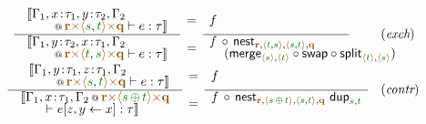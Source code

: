 \begin{figure*}[!t]
\begin{equation*}
\begin{array}{ll}
\hspace{0.5em}\mdeff
  {\begin{array}{l}\sem{\coctx{\Gamma_1,x\!:\!\tau_1,y\!:\!\tau_2,\Gamma_2\\[-0.25em]\qquad}
     {\aclrd{\textbf{r}} \atimes \alift{\cclrd{s},\cclrd{t}} \atimes \aclrd{\textbf{q}}} \vdash e : \tau}\end{array}}
  {\begin{array}{l}\sem{\coctx{\Gamma_1,y\!:\!\tau_2,x\!:\!\tau_1,\Gamma_2\\[-0.25em]\qquad}{\aclrd{\textbf{r}}
          \atimes \alift{\cclrd{t},\cclrd{s}} \atimes \aclrd{\textbf{q}}} \vdash e : \tau}\end{array}}
  {f}
  {\begin{array}{l}\hspace{-0.5em}f\,\circ\,\ident{nest}_{\aclrd{\textbf{r}}, \alift{\cclrd{t},\cclrd{s}},
     \alift{\cclrd{s},\cclrd{t}}, \aclrd{\textbf{q}}}\\[-0.25em]
     ~~(\ident{merge}_{\alift{\cclrd{s}}, \alift{\cclrd{t}}}\circ\ident{swap}\circ\ident{split}_{\alift{\cclrd{t}}, \alift{\cclrd{s}}})\hspace{-5em}~ \end{array} }
& (\emph{exch})
\\[1.5em]
\hspace{0em}\mdeff
  {\begin{array}{l}\sem{\coctx{\Gamma_1,y\!:\!\tau_1,z\!:\!\tau_1,\Gamma_2\\[-0.25em]\qquad}
      {\aclrd{\textbf{r}} \atimes \alift{\cclrd{s},\cclrd{t}} \atimes \aclrd{\textbf{q}}} \vdash e : \tau}\end{array}}
  {\begin{array}{l}\sem{\coctx{\Gamma_1,x\!:\!\tau_1,\Gamma_2}{\aclrd{\textbf{r}}
          \atimes \alift{\cclrd{s} \,\cpar\, \cclrd{t}} \atimes \aclrd{\textbf{q}}} \\[-0.25em] \qquad\vdash \subst{e}{z,y}{x} : \tau}\end{array}}
  {f}
  {\begin{array}{l}\hspace{-0.5em}f\,\circ\,\ident{nest}_{\aclrd{\textbf{r}}, \alift{\cclrd{s}\,\cpar\,\cclrd{t}},
      \alift{\cclrd{s},\cclrd{t}}, \aclrd{\textbf{q}}}~\ident{dup}_{\cclrd{s}, \cclrd{t}}\hspace{-0.5em} \\[-0.25em]~\end{array}}
& (\emph{contr})
\end{array}
\end{equation*}


\end{figure*}
